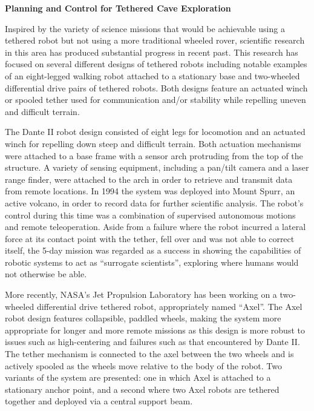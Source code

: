 \documentclass[12pt]{article}
\begin{document}
\newpage

\begin{center}
{\bf Planning and Control for Tethered Cave Exploration }

\end{center}




Inspired by the variety of science missions that would be achievable
using a tethered robot but not using a more traditional wheeled rover, 
scientific research in this area has produced substantial progress in 
recent past. This research has focused on several different designs of
tethered robots including notable examples of an eight-legged walking robot attached to a 
stationary base and two-wheeled differential drive pairs of tethered robots. Both designs
feature an actuated winch or spooled tether used for communication and/or 
stability while repelling uneven and difficult terrain.

The Dante II robot design consisted of eight legs for locomotion and an 
actuated winch for repelling down steep and difficult terrain. Both actuation 
mechanisms were attached to 
a base frame with a sensor arch protruding from the top of the structure. A variety of
sensing equipment, including a pan/tilt camera and a laser range finder,
 were attached to the arch in order to retrieve and transmit data from remote
 locations. In 1994 the system was deployed into Mount Spurr, an active volcano, 
 in order to record data for further scientific analysis. The robot's control 
 during this time was a combination of supervised autonomous motions and remote
 teleoperation. Aside from a failure where the robot incurred a lateral force at its contact
point with the tether, fell over and was not able to correct itself,
 the 5-day mission was regarded as a success in showing the capabilities of robotic
 systems to act as ``surrogate scientists'', exploring where humans would not otherwise
 be able. 

More recently, NASA's Jet Propulsion Laboratory has been working on a two-wheeled
differential drive tethered robot, appropriately named ``Axel''. The Axel robot 
design features collapsible, paddled wheels, making the system more appropriate for longer 
and more remote missions as this design is more robust to issues such as high-centering and 
failures such as that encountered by Dante II. The tether mechanism is connected to the axel 
between the two wheels and is actively spooled as the wheels move relative to the body of the robot. 
Two variants of the system are presented: one in which Axel is attached to a stationary anchor point, 
and a second where two Axel robots are tethered together and deployed via a central support beam. 
\end{document}
